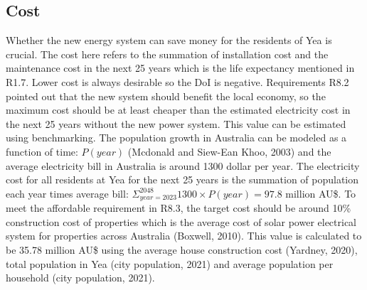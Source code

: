 \documentclass{article}
\begin{document}
\subsection{Cost}
Whether the new energy system can save money for the residents of Yea is crucial. The cost here refers to the summation of installation cost and the maintenance cost in the next 25 years which is the life expectancy mentioned in R1.7. Lower cost is always desirable so the DoI is negative. Requirements R8.2 pointed out that the new system should benefit the local economy, so the maximum cost should be at least cheaper than the estimated electricity cost in the next 25 years without the new power system. This value can be estimated using benchmarking. The population growth in Australia can be modeled as a function of time: \(P(year)\) (Mcdonald and Siew-Ean Khoo, 2003) and the average electricity bill in Australia is around 1300 dollar per year. The electricity cost for all residents at Yea for the next 25 years is the summation of population each year times average bill: \(\Sigma_{year=2023}^{2048} 1300\times P(year)=97.8\) million AU\$. To meet the affordable requirement in R8.3, the target cost should be around 10\% construction cost of properties which is the average cost of solar power electrical system for properties across Australia (Boxwell, 2010). This value is calculated to be 35.78 million AU\$ using the average house construction cost (Yardney, 2020), total population in Yea (city population, 2021) and average population per household (city population, 2021).
\end{document}
